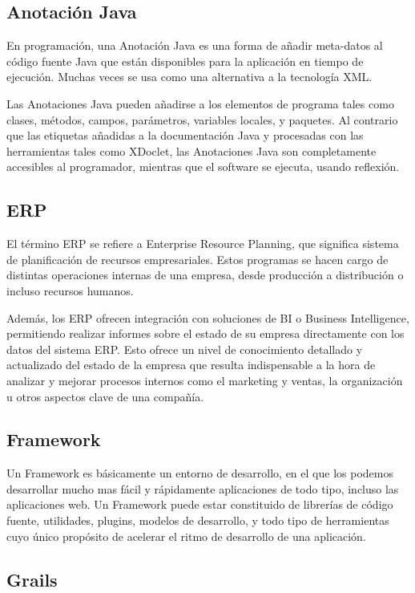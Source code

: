 \subsection{Anotación Java}
\label{glo:anota}

En programación, una Anotación Java es una forma de añadir meta-datos al código fuente Java que están disponibles para la aplicación en tiempo de ejecución. Muchas veces se usa como una alternativa a la tecnología XML.

Las Anotaciones Java pueden añadirse a los elementos de programa tales como clases, métodos, campos, parámetros, variables locales, y paquetes. Al contrario que las etiquetas añadidas a la documentación Java y procesadas con las herramientas tales como XDoclet, las Anotaciones Java son completamente accesibles al programador, mientras que el software se ejecuta, usando reflexión.

\subsection{ERP}
\label{glo:erp}

El término ERP se refiere a Enterprise Resource Planning, que significa sistema de planificación de recursos empresariales. Estos programas se hacen cargo de distintas operaciones internas de una empresa, desde producción a distribución o incluso recursos humanos.

Además, los ERP ofrecen integración con soluciones de BI o Business Intelligence, permitiendo realizar informes sobre el estado de su empresa directamente con los datos del sistema ERP. Esto ofrece un nivel de conocimiento detallado y actualizado del estado de la empresa que resulta indispensable a la hora de analizar y mejorar procesos internos como el marketing y ventas, la organización u otros aspectos clave de una compañía.

\subsection{Framework}
\label{glo:frwk}
Un Framework es básicamente un entorno de desarrollo, en el que los podemos desarrollar mucho mas fácil y rápidamente aplicaciones de todo tipo, incluso las aplicaciones web. Un Framework puede estar constituido de librerías de código fuente, utilidades, plugins, modelos de desarrollo, y todo tipo de herramientas cuyo único propósito de acelerar el ritmo de desarrollo de una aplicación. 

\subsection{Grails}
\label{glo:gra}

